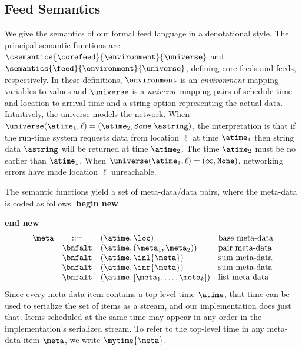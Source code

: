 %



\subsection{Feed Semantics}
We give the semantics of our formal feed language in 
a denotational style.  The principal semantic functions are
$\csemantics{\corefeed}{\environment}{\universe}$ and
$\semantics{\feed}{\environment}{\universe}$, defining core feeds and
feeds, respectively.  In these definitions,
$\environment$ is an {\em environment} mapping variables to values
and $\universe$ is a {\em universe} mapping pairs of
schedule time and location to arrival time and a string option
representing the actual data.
Intuitively, the universe models the network.
When $\universe (\atime_1, \ell) = (\atime_2, \mathtt{Some} \; \astring)$,
 the interpretation is that if the run-time system requests data
from location $\ell$ at time $\atime_1$ then string data $\astring$
will be returned at time $\atime_2$.  The time $\atime_2$ must be
no earlier than $\atime_1$.
When $\universe (\atime_1, \ell) = (\infty, \mathtt{None})$,
networking errors have made location $\ell$ unreachable.

The semantic functions yield a set of meta-data/data pairs, where the 
meta-data is coded as follows.
\textbf{begin new}

\textbf{end new}
%
\[
\begin{array}{lcll} 
\meta & ::=     
& (\atime,\loc) & \mbox{base meta-data} \\
& \bnfalt & (\atime,(\meta_1,\meta_2)) & \mbox{pair meta-data} \\
& \bnfalt & (\atime,\inl{\meta}) & \mbox{sum meta-data} \\
& \bnfalt & (\atime,\inr{\meta}) & \mbox{sum meta-data} \\
& \bnfalt & (\atime,[\meta_1,\ldots,\meta_k]) & \mbox{list meta-data} \\
\end{array}
\]  
%
Since every meta-data item contains a top-level time $\atime$, that
time can be used to serialize the set of items as a stream, and 
our implementation does just that.  Items scheduled at the
same time may appear in any order in the implementation's
serialized stream.  To refer to the top-level time in any meta-data
item $\meta$, we write $\mytime{\meta}$. 

